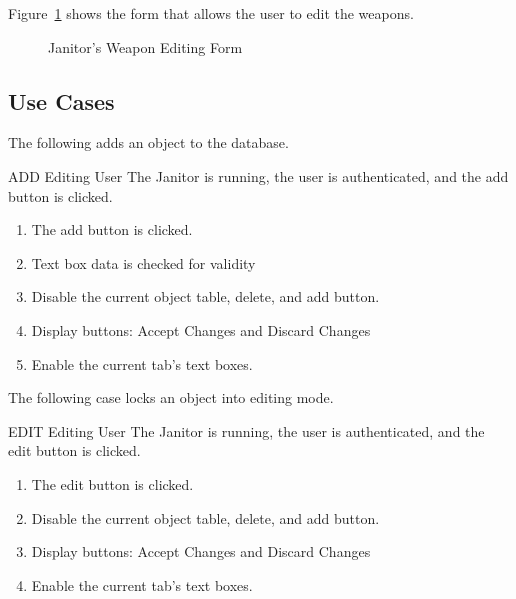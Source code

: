 Figure~\ref{fig:janitor-weapon-editing} shows the form that allows the user to edit the weapons.

\begin{figure}[htbp]
  \centering
  \caption{Janitor's Weapon Editing Form}
  \label{fig:janitor-weapon-editing}
\end{figure}


\subsection{Use Cases}

The following adds an object to the database.

\begin{usecase}
  {ADD}
  {Editing User}
  {The Janitor is running, the user is authenticated, and the add button is clicked.}
\begin{enumerate}
\item The add button is clicked.
\item Text box data is checked for validity
\item Disable the current object table, delete, and add button.
\item Display buttons: Accept Changes and Discard Changes
\item Enable the current tab's text boxes.
\end{enumerate}
\end{usecase}

The following case locks an object into editing mode.

\begin{usecase}
  {EDIT}
  {Editing User}
  {The Janitor is running, the user is authenticated, and the edit button is clicked.}
\begin{enumerate}
\item The edit button is clicked.
\item Disable the current object table, delete, and add button.
\item Display buttons: Accept Changes and Discard Changes
\item Enable the current tab's text boxes.
\end{enumerate}
\end{usecase}

